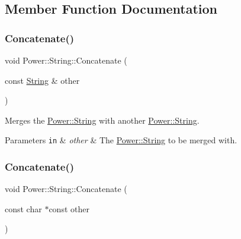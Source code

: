 \subsection{Member Function Documentation}
\mbox{\label{class_power_1_1_string_a06e6def1040275302b2ea78e6ceb05e6}} 
\subsubsection{\texorpdfstring{Concatenate()}{Concatenate()}\hspace{0.1cm}{\footnotesize\ttfamily [1/4]}}
{\footnotesize\ttfamily void Power\+::\+String\+::\+Concatenate (\begin{DoxyParamCaption}\item[{const \hyperlink{class_power_1_1_string}{String} \&}]{other }\end{DoxyParamCaption})\hspace{0.3cm}{\ttfamily [inline]}}



Merges the \hyperlink{class_power_1_1_string}{Power\+::\+String} with another \hyperlink{class_power_1_1_string}{Power\+::\+String}. 


\begin{DoxyParams}[1]{Parameters}
\mbox{\tt in}  & {\em other} & The \hyperlink{class_power_1_1_string}{Power\+::\+String} to be merged with. \\
\hline
\end{DoxyParams}
\mbox{\label{class_power_1_1_string_aa8d8f7ef094a1057e5ab46742b42ad13}} 
\subsubsection{\texorpdfstring{Concatenate()}{Concatenate()}\hspace{0.1cm}{\footnotesize\ttfamily [2/4]}}
{\footnotesize\ttfamily void Power\+::\+String\+::\+Concatenate (\begin{DoxyParamCaption}\item[{const char $\ast$const}]{other }\end{DoxyParamCaption})\hspace{0.3cm}{\ttfamily [inline]}}



